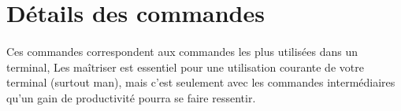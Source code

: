 \documentclass[french, a4paper, 12pt, titlepage]{article}
\begin{document}
\section{Détails des commandes}








\vspace{7em}

\paragraph{} Ces commandes correspondent aux commandes les plus utilisées dans
un terminal,
Les maîtriser est essentiel pour une utilisation courante de votre terminal
(surtout man), mais c'est seulement avec les commandes intermédiaires qu'un
gain de productivité pourra se faire ressentir.

\newpage
\end{document}

